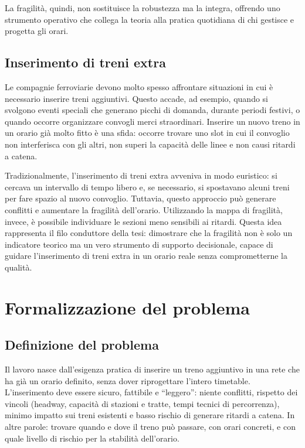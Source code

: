 \documentclass[a4paper,12pt]{report}
\begin{document}
La fragilità, quindi, non sostituisce la robustezza ma la integra, offrendo uno strumento operativo che collega la teoria alla pratica quotidiana di chi gestisce e progetta gli orari.

\section{Inserimento di treni extra}
Le compagnie ferroviarie devono molto spesso affrontare situazioni in cui è necessario inserire treni aggiuntivi. Questo accade, ad esempio, quando si svolgono eventi speciali che generano picchi di domanda, durante periodi festivi, o quando occorre organizzare convogli merci straordinari. Inserire un nuovo treno in un orario già molto fitto è una sfida: occorre trovare uno slot in cui il convoglio non interferisca con gli altri, non superi la capacità delle linee e non causi ritardi a catena.

Tradizionalmente, l’inserimento di treni extra avveniva in modo euristico: si cercava un intervallo di tempo libero e, se necessario, si spostavano alcuni treni per fare spazio al nuovo convoglio. Tuttavia, questo approccio può generare conflitti e aumentare la fragilità dell’orario. Utilizzando la mappa di fragilità, invece, è possibile individuare le sezioni meno sensibili ai ritardi.
Questa idea rappresenta il filo conduttore della tesi: dimostrare che la fragilità non è solo un indicatore teorico ma un vero strumento di supporto decisionale, capace di guidare l’inserimento di treni extra in un orario reale senza comprometterne la qualità.

\chapter{Formalizzazione del problema}

\section{Definizione del problema}
Il lavoro nasce dall’esigenza pratica di inserire un treno aggiuntivo in una rete che ha già un orario definito, senza dover riprogettare l’intero timetable. L’inserimento deve essere sicuro, fattibile e “leggero”: niente conflitti, rispetto dei vincoli (headway, capacità di stazioni e tratte, tempi tecnici di percorrenza), minimo impatto sui treni esistenti e basso rischio di generare ritardi a catena. In altre parole: trovare quando e dove il treno può passare, con orari concreti, e con quale livello di rischio per la stabilità dell’orario.
\end{document}
